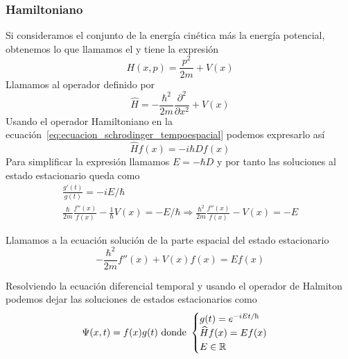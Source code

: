 \subsubsection{Hamiltoniano}
Si consideramos el conjunto de la energía cinética más la energía potencial, obtenemos lo que llamamos el  y tiene la expresión
\begin{equation}
    \label{eq:halmitoniano}
    H(x,p)=\frac{p^2}{2m}+V(x)
\end{equation}
Llamamos  al operador definido por
\begin{equation}
    \label{eq:operador_hamiltoniano}
    \widehat{H}=-\frac{\hbar^2}{2m}\frac{\partial^2}{\partial x^2}+V(x)
\end{equation}
Usando el operador Hamiltoniano en la ecuación~\ref{eq:ecuacion_schrodinger_tempoespacial} podemos expresarlo así
\begin{equation*}
    \widehat{H}f(x)=-i\hbar Df(x)
\end{equation*}
Para simplificar la expresión llamamos $E=-\hbar D$ y por tanto las soluciones al estado estacionario queda como
\begin{gather*}
    \frac{g'(t)}{g(t)}=-iE/\hbar
    \\
    \frac{\hbar}{2m}\frac{f''(x)}{f(x)}-\frac{1}{\hbar}V(x)=-E/\hbar\Rightarrow \frac{\hbar^2}{2m}\frac{f''(x)}{f(x)}-V(x)=-E
\end{gather*}

\begin{definicion}
    Llamamos  a la ecuación solución de la parte espacial del estado estacionario
    \begin{equation}
        \label{eq:ecuacion_schrodinger_tempoespacial}
        -\frac{\hbar^2}{2m}f''(x)+V(x)f(x)= Ef(x)
    \end{equation}
\end{definicion}

Resolviendo la ecuación diferencial temporal y usando el operador de Halmiton podemos dejar las soluciones de estados estacionarios como
\begin{equation}
    \label{eq:solucion_estado_estacionario}
    \Psi(x,t)=f(x)g(t)\text{ donde }
    \begin{cases}
        g(t)=e^{-iEt/\hbar}\\
        \widehat{H}f(x)=Ef(x)\\
        E\in\R
    \end{cases}
\end{equation}

